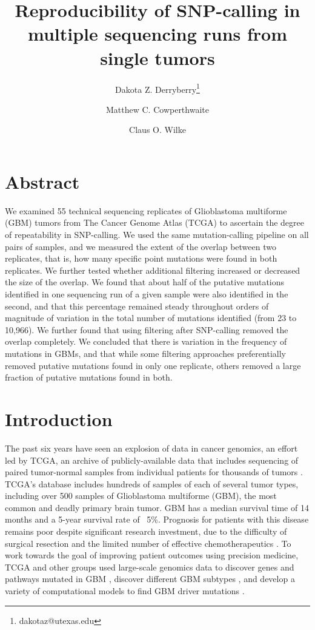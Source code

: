 \documentclass[11pt]{article} %
\title{Reproducibility of SNP-calling in multiple sequencing runs from single tumors}
\author[1]{Dakota Z. Derryberry\thanks{dakotaz@utexas.edu}}
\author[3]{Matthew C. Cowperthwaite}
\author[1,2]{Claus O. Wilke}
\affil[1]{The University of Texas at Austin, Cell \& Molecular Biology}
\affil[2]{The University of Texas at Austin, Integrative Biology}
\affil[3]{St. David's NeuroTexas Institute Research Foundation}
\begin{document}
\maketitle

\section*{Abstract}

We examined 55 technical sequencing replicates of Glioblastoma multiforme (GBM) tumors from The Cancer Genome Atlas (TCGA) to ascertain the degree of repeatability in SNP-calling. We used the same mutation-calling pipeline on all pairs of samples, and we measured the extent of the overlap between two replicates, that is, how many specific point mutations were found in both replicates. We further tested whether additional filtering increased or decreased the size of the overlap.  We found that about half of the putative mutations identified in one sequencing run of a given sample were also identified in the second, and that this percentage remained steady throughout orders of magnitude of variation in the total number of mutations identified (from 23 to 10,966). We further found that using filtering after SNP-calling removed the overlap completely. We concluded that there is variation in the frequency of mutations in GBMs, and that while some filtering approaches preferentially removed putative mutations found in only one replicate, others removed a large fraction of putative mutations found in both.

\section*{Introduction}

The past six years have seen an explosion of data in cancer genomics, an effort led by TCGA, an archive of publicly-available data that includes sequencing of paired tumor-normal samples from individual patients for thousands of tumors \citep{TCGA-GBM, TCGA-GBM-13}. TCGA's database includes hundreds of samples of each of several tumor types, including over 500 samples of Glioblastoma multiforme (GBM), the most common and deadly primary brain tumor. GBM has a median survival time of 14 months and a 5-year survival rate of ~5\%. Prognosis for patients with this disease remains poor despite significant research investment, due to the difficulty of surgical resection and the limited number of effective chemotherapeutics \citep{GBM-stats}. To work towards the goal of improving patient outcomes using precision medicine, TCGA and other groups \citep{Parsons} used large-scale genomics data to discover genes and pathways mutated in GBM \citep{pathways}, discover different GBM subtypes \citep{subtypes}, and develop a variety of computational models to find GBM driver mutations \citep{drivers}.
\end{document}
